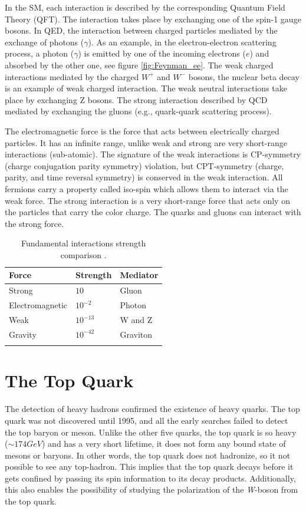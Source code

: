 In the SM, each interaction is described by the corresponding Quantum Field Theory (QFT). The interaction takes place by exchanging one of the spin-1 gauge bosons. In QED, the interaction between charged particles mediated by the exchange of photons ($\gamma$). As an example, in the electron-electron scattering process, a photon ($\gamma$) is emitted by one of the incoming electrons ($e$) and absorbed by the other one, see figure \ref{fig:Feynman_ee}. The weak charged interactions mediated by the charged $W^{+}$ and $W^{-}$ bosons, the nuclear beta decay is an example of weak charged interaction. The weak neutral interactions take place by exchanging Z bosons. The strong interaction described by QCD mediated by exchanging the gluons (e.g., quark-quark scattering process). 

The electromagnetic force is the force that acts between electrically charged particles. It has an infinite range, unlike weak and strong are very short-range interactions (sub-atomic). The signature of the weak interactions is CP-symmetry (charge conjugation parity symmetry) violation, but CPT-symmetry (charge, parity, and time reversal symmetry) is conserved in the weak interaction. All fermions carry a property called iso-spin which allows them to interact via the weak force. The strong interaction is a very short-range force that acts only on the particles that carry the color charge. The quarks and gluons can interact with the strong force.

\begin{table}[H]
\caption{Fundamental interactions strength comparison \cite{Interactions}.}
\label{tab:FundamentalInteractions}
\centering
\begin{tabular}{l l l}
\toprule
Force & Strength & Mediator \\
\midrule
Strong & \(10\) & Gluon\\
Electromagnetic & \(10^{-2}\) & Photon\\
Weak & \(10^{-13}\) & W and Z \\
Gravity & \(10^{-42}\) & Graviton\\
\bottomrule\\
\end{tabular}
\end{table}

\section{The Top Quark}
\label{TopQ}

The detection of heavy hadrons confirmed the existence of heavy quarks. The top quark was not discovered until 1995, and all the early searches failed to detect the top baryon or meson. Unlike the other five quarks, the top quark is so heavy ($\sim174GeV$) and has a very short lifetime, it does not form any bound state of mesons or baryons. In other words, the top quark does not hadronize, so it not possible to see any top-hadron. This implies that the top quark decays before it gets confined by passing its spin information to its decay products. Additionally, this also enables the possibility of studying the polarization of the \textit{W}-boson from the top quark.

